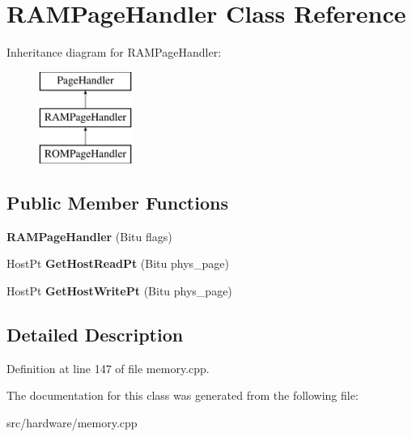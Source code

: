 \hypertarget{classRAMPageHandler}{\section{R\-A\-M\-Page\-Handler Class Reference}
\label{classRAMPageHandler}
}
Inheritance diagram for R\-A\-M\-Page\-Handler\-:\begin{figure}[H]
\begin{center}
\leavevmode
\includegraphics[height=3.000000cm]{classRAMPageHandler}
\end{center}
\end{figure}
\subsection*{Public Member Functions}
\begin{DoxyCompactItemize}
\item 
\hypertarget{classRAMPageHandler_a1a9d31214da07316be390b315bd48344}{{\bfseries R\-A\-M\-Page\-Handler} (Bitu flags)}\label{classRAMPageHandler_a1a9d31214da07316be390b315bd48344}

\item 
\hypertarget{classRAMPageHandler_aa96438cf48e183202b6d9bdef1ff858a}{Host\-Pt {\bfseries Get\-Host\-Read\-Pt} (Bitu phys\-\_\-page)}\label{classRAMPageHandler_aa96438cf48e183202b6d9bdef1ff858a}

\item 
\hypertarget{classRAMPageHandler_a08d7b2d963c5afb626c6aea199bc3a1b}{Host\-Pt {\bfseries Get\-Host\-Write\-Pt} (Bitu phys\-\_\-page)}\label{classRAMPageHandler_a08d7b2d963c5afb626c6aea199bc3a1b}

\end{DoxyCompactItemize}


\subsection{Detailed Description}


Definition at line 147 of file memory.\-cpp.



The documentation for this class was generated from the following file\-:\begin{DoxyCompactItemize}
\item 
src/hardware/memory.\-cpp\end{DoxyCompactItemize}
